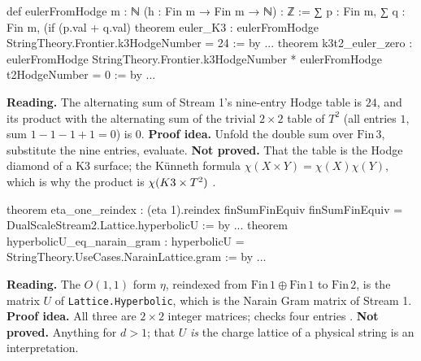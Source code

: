 \begin{leanbox}
\begin{leancode}
def eulerFromHodge {m : ℕ} (h : Fin m → Fin m → ℕ) : ℤ :=
  ∑ p : Fin m, ∑ q : Fin m,
    (if (p.val + q.val) %
theorem euler_K3 :
    eulerFromHodge StringTheory.Frontier.k3HodgeNumber = 24 := by ...
theorem k3t2_euler_zero :
    eulerFromHodge StringTheory.Frontier.k3HodgeNumber
      * eulerFromHodge t2HodgeNumber = 0 := by ...
\end{leancode}
\textbf{Reading.} The alternating sum of Stream 1's nine-entry Hodge table is $24$, and
its product with the alternating sum of the trivial $2\times2$ table of $T^2$ (all entries
$1$, sum $1-1-1+1=0$) is $0$. \textbf{Proof idea.} Unfold the double sum over
$\mathrm{Fin}\,3$, substitute the nine entries, evaluate. \textbf{Not proved.} That the
table is the Hodge diamond of a K3 surface; the K\"unneth formula
$\chi(X\times Y)=\chi(X)\chi(Y)$, which is why the product is $\chi(K3\times T^2)$
. \TA
\end{leanbox}

\begin{leanbox}
\begin{leancode}
theorem eta_one_reindex :
    (eta 1).reindex finSumFinEquiv finSumFinEquiv
      = DualScaleStream2.Lattice.hyperbolicU := by ...
theorem hyperbolicU_eq_narain_gram :
    hyperbolicU = StringTheory.UseCases.NarainLattice.gram := by ...
\end{leancode}
\textbf{Reading.} The $O(1,1)$ form $\eta$, reindexed from $\mathrm{Fin}\,1\oplus
\mathrm{Fin}\,1$ to $\mathrm{Fin}\,2$, is the matrix $U$ of \texttt{Lattice.Hyperbolic},
which is the Narain Gram matrix of Stream 1. \textbf{Proof idea.} All three are
$2\times2$ integer matrices; 
checks four entries . \textbf{Not proved.}
Anything for $d>1$; that $U$ \emph{is} the charge lattice of a physical string is an
interpretation. \TA
\end{leanbox}

